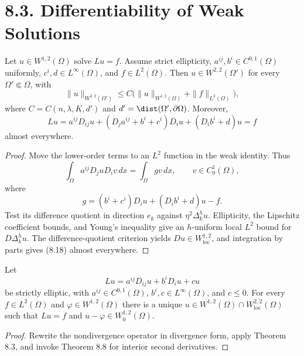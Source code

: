 \section*{8.3. Differentiability of Weak Solutions}

\begin{theorem}
\label{gt-thm-8-8-interior-w22}
Let $u\in W^{1,2}(\Omega)$ solve $Lu=f$. Assume strict ellipticity,
$a^{ij},b^i\in C^{0,1}(\Omega)$ uniformly, $c^i,d\in L^\infty(\Omega)$, and
$f\in L^2(\Omega)$. Then $u\in W^{2,2}(\Omega')$ for every
$\Omega'\Subset\Omega$, with
\begin{equation}
\|u\|_{W^{2,2}(\Omega')}
\leq C\bigl(\|u\|_{W^{1,2}(\Omega)}+\|f\|_{L^2(\Omega)}\bigr),
\tag{8.17}
\end{equation}
where $C=C(n,\lambda,K,d')$ and $d'=\dist(\Omega',\partial\Omega)$.
Moreover,
\begin{equation}
Lu=a^{ij}D_{ij}u+(D_ja^{ij}+b^i+c^i)D_iu+(D_ib^i+d)u=f
\tag{8.18}
\end{equation}
almost everywhere.
\end{theorem}
\begin{proof}
\sketch Move the lower-order terms to an $L^2$ function in the weak identity.
Thus
\begin{equation}
\tag{8.19}
\int_\Omega a^{ij}D_j uD_i v\,dx=\int_\Omega gv\,dx,
\qquad v\in C_0^1(\Omega),
\end{equation}
where
\begin{equation}
\tag{8.20}
g=(b^i+c^i)D_i u+(D_i b^i+d)u-f.
\end{equation}
Test its difference quotient in direction $e_k$ against
$\eta^2\Delta_k^hu$. Ellipticity, the Lipschitz coefficient bounds, and Young's
inequality give an $h$-uniform local $L^2$ bound for $D\Delta_k^hu$.
The difference-quotient criterion yields $Du\in W^{1,2}_{\mathrm{loc}}$, and
integration by parts gives (8.18) almost everywhere.
\end{proof}

\begin{theorem}
\label{gt-thm-8-9-strong-dirichlet-solvability}
Let
\begin{equation}
Lu=a^{ij}D_{ij}u+b^iD_iu+cu
\tag{8.21}
\end{equation}
be strictly elliptic, with
$a^{ij}\in C^{0,1}(\Omega)$, $b^i,c\in L^\infty(\Omega)$, and $c\leq0$.
For every $f\in L^2(\Omega)$ and $\varphi\in W^{1,2}(\Omega)$ there is a unique
$u\in W^{1,2}(\Omega)\cap W^{2,2}_{\mathrm{loc}}(\Omega)$ such that
$Lu=f$ and $u-\varphi\in W_0^{1,2}(\Omega)$.
\end{theorem}
\begin{proof}
\sketch Rewrite the nondivergence operator in divergence form, apply Theorem 8.3,
and invoke Theorem 8.8 for interior second derivatives.
\end{proof}

